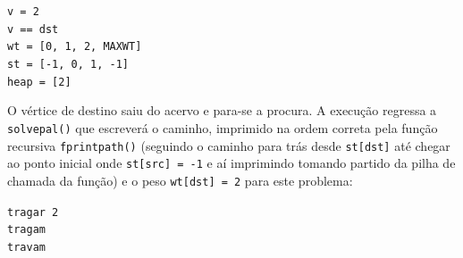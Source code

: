 \documentclass[a4paper, 18pt]{article}
\begin{document}
	\begin{center}
		\texttt{v = 2 \\
		v == dst \\
		wt = [0, 1, 2, MAX\textunderscore WT] \\
		st = [-1, 0, 1, -1] \\
		heap = [2] \\}
	\end{center}
	\par
	O vértice de destino saiu do acervo e para-se a procura. A execução regressa a \texttt{solve\textunderscore pal()} que escreverá o caminho, imprimido na ordem correta pela função recursiva \texttt{fprint\textunderscore path()} (seguindo o caminho para trás desde \texttt{st[dst]} até chegar ao ponto inicial onde \texttt{st[src] = -1} e aí imprimindo tomando partido da pilha de chamada da função) e o peso \texttt{wt[dst] = 2} para este problema:
	\begin{center}
		\texttt{tragar 2 \\
				tragam \\
				travam}
	\end{center}
\end{document}
